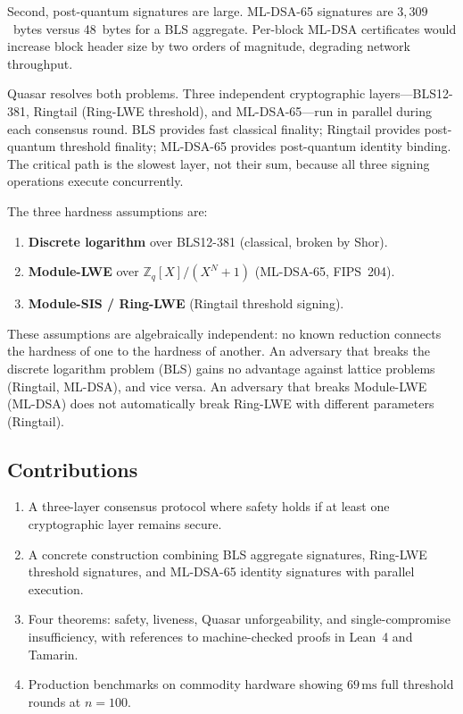 \documentclass[11pt,a4paper]{article}
\begin{document}
Second, post-quantum signatures are large. ML-DSA-65 signatures are
$3{,}309$~bytes versus 48~bytes for a BLS aggregate. Per-block ML-DSA
certificates would increase block header size by two orders of magnitude,
degrading network throughput.

Quasar resolves both problems. Three independent cryptographic layers---BLS12-381,
Ringtail (Ring-LWE threshold), and ML-DSA-65---run in parallel during each
consensus round. BLS provides fast classical finality; Ringtail provides
post-quantum threshold finality; ML-DSA-65 provides post-quantum identity
binding. The critical path is the slowest layer, not their sum, because all
three signing operations execute concurrently.

The three hardness assumptions are:
\begin{enumerate}[leftmargin=2em]
\item \textbf{Discrete logarithm} over BLS12-381 (classical, broken by Shor).
\item \textbf{Module-LWE} over $\mathbb{Z}_q[X]/(X^N+1)$ (ML-DSA-65, FIPS~204).
\item \textbf{Module-SIS / Ring-LWE} (Ringtail threshold signing).
\end{enumerate}
These assumptions are algebraically independent: no known reduction connects
the hardness of one to the hardness of another. An adversary that breaks the
discrete logarithm problem (BLS) gains no advantage against lattice problems
(Ringtail, ML-DSA), and vice versa. An adversary that breaks Module-LWE
(ML-DSA) does not automatically break Ring-LWE with different parameters
(Ringtail).

\subsection{Contributions}

\begin{enumerate}[leftmargin=2em]
\item A three-layer consensus protocol where safety holds if at least one
      cryptographic layer remains secure.
\item A concrete construction combining BLS aggregate signatures, Ring-LWE
      threshold signatures, and ML-DSA-65 identity signatures with parallel
      execution.
\item Four theorems: safety, liveness, Quasar unforgeability, and
      single-compromise insufficiency, with references to machine-checked
      proofs in Lean~4 and Tamarin.
\item Production benchmarks on commodity hardware showing $69\,\text{ms}$
      full threshold rounds at $n=100$.
\end{enumerate}
\end{document}
